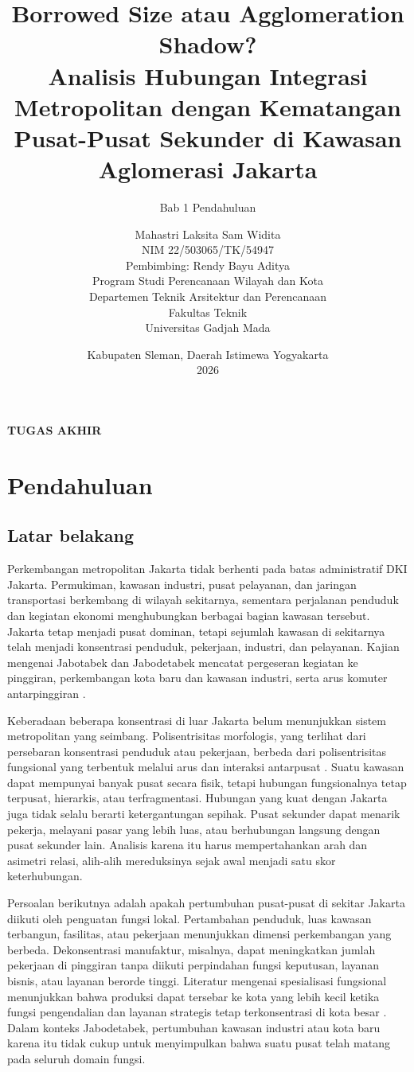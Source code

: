 \documentclass[11pt,a4paper,oneside,openany,indonesian]{report}
\title{\textbf{Borrowed Size atau Agglomeration Shadow?}\\[0.4em]
Analisis Hubungan Integrasi Metropolitan dengan Kematangan Pusat-Pusat Sekunder di Kawasan Aglomerasi Jakarta}
\subtitle{Bab 1 Pendahuluan}
\author{Mahastri Laksita Sam Widita\\NIM 22/503065/TK/54947\\[0.5em]
Pembimbing: Rendy Bayu Aditya\\[0.5em]
Program Studi Perencanaan Wilayah dan Kota\\
Departemen Teknik Arsitektur dan Perencanaan\\
Fakultas Teknik\\
Universitas Gadjah Mada}
\date{Kabupaten Sleman, Daerah Istimewa Yogyakarta\\2026}
\makeatletter
\renewcommand{\maketitle}{%
  \begin{titlepage}
    \centering
    {\Large\bfseries TUGAS AKHIR\par}
    \vfill
    {\LARGE\bfseries \@title\par}
    \vspace{1.2cm}
    {\large \thesubtitle\par}
    \vfill
    {\large \@author\par}
    \vfill
    {\large \@date\par}
  \end{titlepage}}
\makeatother
\begin{document}
\maketitle
\tableofcontents
\clearpage

\chapter{Pendahuluan}

\section{Latar belakang}

Perkembangan metropolitan Jakarta tidak berhenti pada batas administratif DKI Jakarta. Permukiman, kawasan industri, pusat pelayanan, dan jaringan transportasi berkembang di wilayah sekitarnya, sementara perjalanan penduduk dan kegiatan ekonomi menghubungkan berbagai bagian kawasan tersebut. Jakarta tetap menjadi pusat dominan, tetapi sejumlah kawasan di sekitarnya telah menjadi konsentrasi penduduk, pekerjaan, industri, dan pelayanan. Kajian mengenai Jabotabek dan Jabodetabek mencatat pergeseran kegiatan ke pinggiran, perkembangan kota baru dan kawasan industri, serta arus komuter antarpinggiran \parencite{henderson1996,hudalahfirman2012,hudalahetal2013,sadewoetal2023}.

Keberadaan beberapa konsentrasi di luar Jakarta belum menunjukkan sistem metropolitan yang seimbang. Polisentrisitas morfologis, yang terlihat dari persebaran konsentrasi penduduk atau pekerjaan, berbeda dari polisentrisitas fungsional yang terbentuk melalui arus dan interaksi antarpusat \parencite{burgermeijers2012}. Suatu kawasan dapat mempunyai banyak pusat secara fisik, tetapi hubungan fungsionalnya tetap terpusat, hierarkis, atau terfragmentasi. Hubungan yang kuat dengan Jakarta juga tidak selalu berarti ketergantungan sepihak. Pusat sekunder dapat menarik pekerja, melayani pasar yang lebih luas, atau berhubungan langsung dengan pusat sekunder lain. Analisis karena itu harus mempertahankan arah dan asimetri relasi, alih-alih mereduksinya sejak awal menjadi satu skor keterhubungan.

Persoalan berikutnya adalah apakah pertumbuhan pusat-pusat di sekitar Jakarta diikuti oleh penguatan fungsi lokal. Pertambahan penduduk, luas kawasan terbangun, fasilitas, atau pekerjaan menunjukkan dimensi perkembangan yang berbeda. Dekonsentrasi manufaktur, misalnya, dapat meningkatkan jumlah pekerjaan di pinggiran tanpa diikuti perpindahan fungsi keputusan, layanan bisnis, atau layanan berorde tinggi. Literatur mengenai spesialisasi fungsional menunjukkan bahwa produksi dapat tersebar ke kota yang lebih kecil ketika fungsi pengendalian dan layanan strategis tetap terkonsentrasi di kota besar \parencite{durantonpuga2005}. Dalam konteks Jabodetabek, pertumbuhan kawasan industri atau kota baru karena itu tidak cukup untuk menyimpulkan bahwa suatu pusat telah matang pada seluruh domain fungsi.
\end{document}
